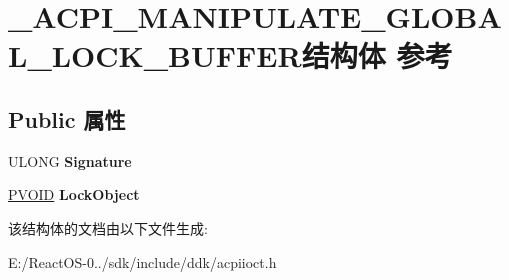 \hypertarget{struct___a_c_p_i___m_a_n_i_p_u_l_a_t_e___g_l_o_b_a_l___l_o_c_k___b_u_f_f_e_r}{}\section{\+\_\+\+A\+C\+P\+I\+\_\+\+M\+A\+N\+I\+P\+U\+L\+A\+T\+E\+\_\+\+G\+L\+O\+B\+A\+L\+\_\+\+L\+O\+C\+K\+\_\+\+B\+U\+F\+F\+E\+R结构体 参考}
\label{struct___a_c_p_i___m_a_n_i_p_u_l_a_t_e___g_l_o_b_a_l___l_o_c_k___b_u_f_f_e_r}
\subsection*{Public 属性}
\begin{DoxyCompactItemize}
\item 
\mbox{\label{struct___a_c_p_i___m_a_n_i_p_u_l_a_t_e___g_l_o_b_a_l___l_o_c_k___b_u_f_f_e_r_aea319e1e09a973b49387453e03f12b4c}} 
U\+L\+O\+NG {\bfseries Signature}
\item 
\mbox{\label{struct___a_c_p_i___m_a_n_i_p_u_l_a_t_e___g_l_o_b_a_l___l_o_c_k___b_u_f_f_e_r_a54a6823e1433b510d754f52a6bc293c2}} 
\hyperlink{interfacevoid}{P\+V\+O\+ID} {\bfseries Lock\+Object}
\end{DoxyCompactItemize}


该结构体的文档由以下文件生成\+:\begin{DoxyCompactItemize}
\item 
E\+:/\+React\+O\+S-\/0../sdk/include/ddk/acpiioct.\+h\end{DoxyCompactItemize}
